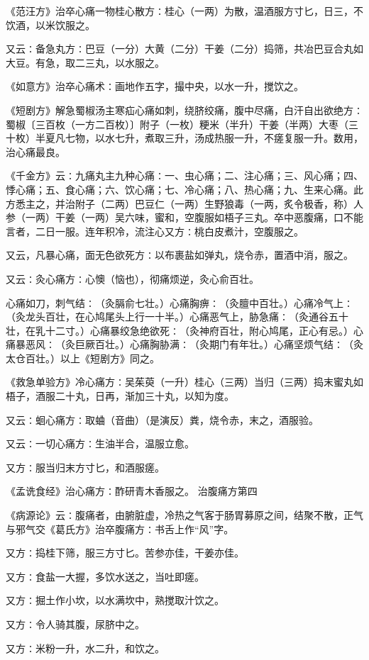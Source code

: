\documentclass[a4paper,12pt,UTF8,twoside]{ctexbook}
\begin{document}
《范汪方》治卒心痛一物桂心散方∶桂心（一两）为散，温酒服方寸匕，日三，不饮酒，以米饮服之。

又云∶备急丸方∶巴豆（一分）大黄（二分）干姜（二分）捣筛，共冶巴豆合丸如大豆。有急，取二三丸，以水服之。

《如意方》治卒心痛术∶画地作五字，撮中央，以水一升，搅饮之。

《短剧方》解急蜀椒汤主寒疝心痛如刺，绕脐绞痛，腹中尽痛，白汗自出欲绝方∶蜀椒〔三百枚（一方二百枚）〕附子（一枚）粳米（半升）干姜（半两）大枣（三十枚）半夏凡七物，以水七升，煮取三升，汤成热服一升，不瘥复服一升。数用，治心痛最良。

《千金方》云∶九痛丸主九种心痛∶一、虫心痛；二、注心痛；三、风心痛；四、悸心痛；五、食心痛；六、饮心痛；七、冷心痛；八、热心痛；九、生来心痛。此方悉主之，并治附子（二两）巴豆仁（一两）生野狼毒（一两，炙令极香，称）人参（一两）干姜（一两）吴六味，蜜和，空腹服如梧子三丸。卒中恶腹痛，口不能言者，二日一服。连年积冷，流注心又方∶桃白皮煮汁，空腹服之。

又云，凡暴心痛，面无色欲死方∶以布裹盐如弹丸，烧令赤，置酒中消，服之。

又云∶灸心痛方∶心懊（恼也），彻痛烦逆，灸心俞百壮。

心痛如刀，刺气结∶（灸膈俞七壮。）心痛胸痹∶（灸膻中百壮。）心痛冷气上∶（灸龙头百壮，在心鸠尾头上行一十半。）心痛恶气上，胁急痛∶（灸通谷五十壮，在乳十二寸。）心痛暴绞急绝欲死∶（灸神府百壮，附心鸠尾，正心有忌。）心痛暴恶风∶（灸巨厥百壮。）心痛胸胁满∶（灸期门有年壮。）心痛坚烦气结∶（灸太仓百壮。）以上《短剧方》同之。

《救急单验方》冷心痛方∶吴茱萸（一升）桂心（三两）当归（三两）捣末蜜丸如梧子，酒服二十丸，日再，渐加三十丸，以知为度。

又云∶蛔心痛方∶取蛐（音曲）（是演反）粪，烧令赤，末之，酒服验。

又云∶一切心痛方∶生油半合，温服立愈。

又方∶服当归末方寸匕，和酒服瘥。

《孟诜食经》治心痛方∶酢研青木香服之。
治腹痛方第四

《病源论》云∶腹痛者，由腑脏虚，冷热之气客于肠胃募原之间，结聚不散，正气与邪气交《葛氏方》治卒腹痛方∶书舌上作“风”字。

又方∶捣桂下筛，服三方寸匕。苦参亦佳，干姜亦佳。

又方∶食盐一大握，多饮水送之，当吐即瘥。

又方∶掘土作小坎，以水满坎中，熟搅取汁饮之。

又方∶令人骑其腹，尿脐中之。

又方∶米粉一升，水二升，和饮之。
\end{document}
